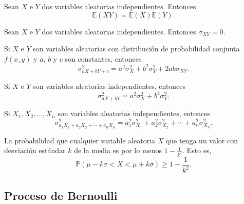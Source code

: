 \begin{theorem}[]
Sean $X$ e $Y$ dos variables aleatorias independientes. Entonces
\begin{equation*}
\mathds{E}\left(XY\right)=\mathds{E}\left(X\right)\mathds{E}\left(Y\right).
\end{equation*}
\end{theorem}

\begin{corollary}[]
Sean $X$ e $Y$ dos variables aleatorias independientes. Entonces $\sigma_{XY}=0$.
\end{corollary}

\begin{theorem}[]
Si $X$ e $Y$ son variables aleatorias con distribución de probabilidad conjunta $f\left(x,y\right)$ y $a$, $b$ y $c$ son constantes, entonces
\begin{equation*}
\sigma^{2}_{aX+bY+c}=a^{2}\sigma^{2}_{X}+b^{2}\sigma^{2}_{Y}+2ab\sigma_{XY}.
\end{equation*}
\end{theorem}

\begin{corollary}[]
Si $X$ e $Y$ son variables aleatorias independientes, entonces
\begin{equation*}
\sigma^{2}_{aX+bY}=a^{2}\sigma^{2}_{X}+b^{2}\sigma^{2}_{Y}.
\end{equation*}
\end{corollary}

\begin{corollary}[]
Si $X_{1}, X_{2},\ldots, X_{n}$ son variables aleatorias independientes, entonces
\begin{equation*}
\sigma^{2}_{a_{1}X_{1}+a_{2}X_{2}+\cdots+a_{n}X_{n}}=a^{2}_{1}\sigma^{2}_{X_{1}}+a^{2}_{2}\sigma^{2}_{X_{2}}+\cdots+a^{2}_{n}\sigma^{2}_{X_{n}}.
\end{equation*}
\end{corollary}

\begin{theorem}[Chebyshev]
La probabilidad que cualquier variable aleatoria $X$ que tenga un valor con desviación estándar $k$ de la media es por lo menos $1-\tfrac{1}{k^{2}}$. Esto es,
\begin{equation*}
\mathds{P}\left(\mu-k\sigma<X<\mu+k\sigma\right)\ge 1-\frac{1}{k^{2}}.
\end{equation*}
\end{theorem}

\subsection*{Proceso de Bernoulli}

